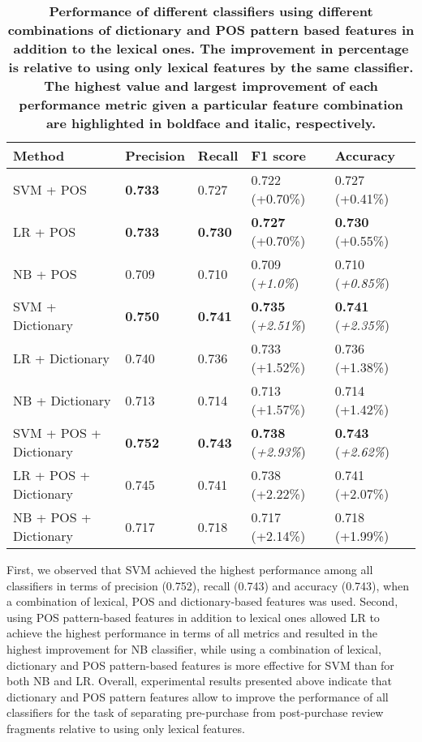 \documentclass[runningheads,a4paper]{llncs}
\begin{document}
\begin{table}
\caption{\label{tab:prepost_perf2}\textbf{Performance of different classifiers using different combinations of dictionary and POS pattern based features in addition to the lexical
ones. The improvement in percentage is relative to using only lexical features by the same classifier. The highest value and largest improvement of each performance metric given a
particular feature combination are highlighted in boldface and italic, respectively.}}
\centering
\begin{tabular} { |l|l|l|l|l| }
\hline\hline
{\bf Method} & {\bf Precision}  & {\bf Recall} & {\bf F1 score } & {\bf Accuracy} \\
\hline
SVM + POS & {\bf 0.733} & 0.727 & 0.722 (+0.70\%) & 0.727 (+0.41\%) \\
\hline
LR + POS & {\bf 0.733} & {\bf 0.730} & {\bf 0.727} (+0.70\%) & {\bf 0.730} (+0.55\%) \\
\hline
NB + POS & 0.709 & 0.710 & 0.709 ({\it +1.0\%}) &  0.710 ({\it +0.85\%}) \\
\hline \hline
SVM + Dictionary & {\bf 0.750} & {\bf 0.741} & {\bf 0.735} ({\it +2.51\%}) & {\bf 0.741} ({\it +2.35\%}) \\
\hline
LR + Dictionary & 0.740 &  0.736 & 0.733 (+1.52\%) &  0.736 (+1.38\%) \\
\hline
NB + Dictionary & 0.713 &  0.714 &  0.713 (+1.57\%)  &  0.714 (+1.42\%)\\
\hline\hline
SVM + POS + Dictionary & {\bf 0.752} & {\bf 0.743} & {\bf 0.738} ({\it +2.93\%}) &  {\bf 0.743} ({\it +2.62\%}) \\
\hline
LR + POS + Dictionary  & 0.745 &  0.741 & 0.738 (+2.22\%) &  0.741 (+2.07\%) \\
\hline
NB + POS + Dictionary & 0.717 &  0.718 & 0.717 (+2.14\%) &  0.718  (+1.99\%)\\
\hline\hline
\end{tabular}
\end{table}

First, we observed that SVM achieved the highest performance among all classifiers in terms of precision (0.752), recall (0.743) and accuracy (0.743), when a combination of
lexical, POS and dictionary-based features was used. Second, using POS pattern-based features in addition to lexical ones allowed LR to achieve the highest performance in terms of
all metrics and resulted in the highest improvement for NB classifier, while using a combination of lexical, dictionary and POS pattern-based features is more effective for SVM
than for both NB and LR. Overall, experimental results presented above indicate that dictionary and POS pattern features allow to improve the performance of all classifiers for the
task of separating pre-purchase from post-purchase review fragments relative to using only lexical features.
\end{document}
